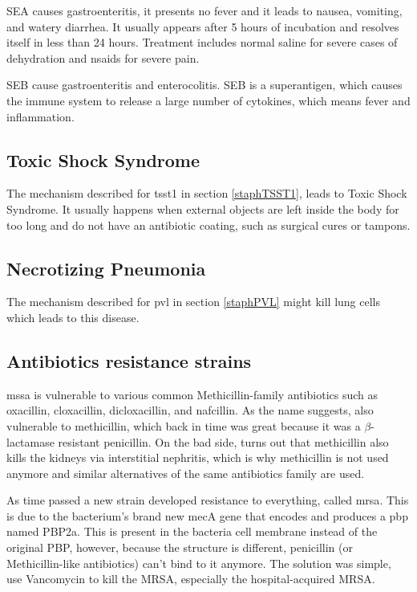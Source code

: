 SEA causes gastroenteritis, it presents no fever and it leads to nausea, vomiting, and watery diarrhea. It usually appears after 5 hours of incubation and resolves itself in less than 24 hours. Treatment includes normal saline for severe cases of dehydration and \gls{nsaids} for severe pain.

SEB cause gastroenteritis and enterocolitis. SEB is a superantigen, which causes the immune system to release a large number of cytokines, which means fever and inflammation. 

\subsection{Toxic Shock Syndrome}

The mechanism described for \gls{tsst1} in section \ref{staphTSST1}, leads to Toxic Shock Syndrome. It usually happens when external objects are left inside the body for too long and do not have an antibiotic coating, such as surgical cures or tampons.

\subsection{Necrotizing Pneumonia}

The mechanism described for \gls{pvl} in section \ref{staphPVL} might kill lung cells which leads to this disease.


\subsection{Antibiotics resistance strains}

\gls{mssa} is vulnerable to various common Methicillin-family antibiotics such as oxacillin, cloxacillin, dicloxacillin, and nafcillin. As the name suggests, also vulnerable to methicillin, which back in time was great because it was a $\beta$-lactamase resistant penicillin. On the bad side, turns out that methicillin also kills the kidneys via interstitial nephritis, which is why methicillin is not used anymore and similar alternatives of the same antibiotics family are used.

As time passed a new strain developed resistance to everything, called \gls{mrsa}. This is due to the bacterium's brand new mecA gene that encodes and produces a \gls{pbp} named PBP2a. This is present in the bacteria cell membrane instead of the original PBP, however, because the structure is different, penicillin (or Methicillin-like antibiotics) can't bind to it anymore. The solution was simple, use Vancomycin to kill the MRSA, especially the hospital-acquired MRSA.

